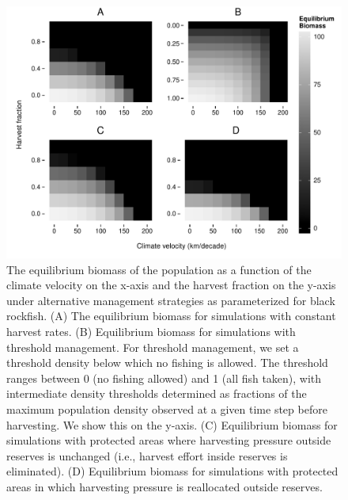 \documentclass[12pt,english]{article}
\begin{document}
\begin{figure}[h]
\centering
\includegraphics[width=.75\textwidth]{../../../plots/rockfish_sims.pdf}
\caption{\label{simulation_rockfish} The equilibrium biomass of the population as a function of the climate velocity on the x-axis and the harvest fraction on the y-axis under alternative management strategies as parameterized for black rockfish. (A) The equilibrium biomass for simulations with constant harvest rates. (B) Equilibrium biomass for simulations with threshold management. For threshold management, we set a threshold density below which no fishing is allowed. The threshold ranges between 0 (no fishing allowed) and 1 (all fish taken), with intermediate density thresholds determined as fractions of the maximum population density observed at a given time step before harvesting. We show this on the y-axis. (C) Equilibrium biomass for simulations with protected areas where harvesting pressure outside reserves is unchanged  (i.e., harvest effort inside reserves is eliminated). (D) Equilibrium biomass for simulations with protected areas in which harvesting pressure is reallocated outside reserves.}
\end{figure}


\cleardoublepage

\end{document}
